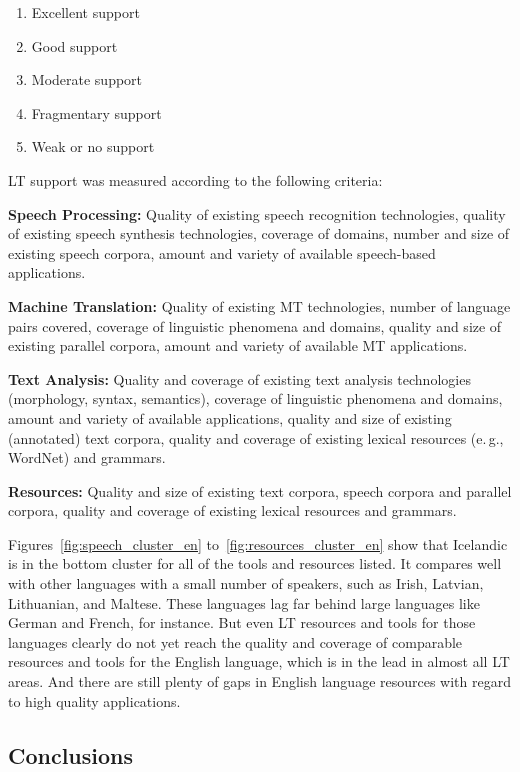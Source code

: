 \begin{multicols}{2}
\begin{enumerate}
\item Excellent support
\item Good support
\item Moderate support
\item Fragmentary support
\item Weak or no support
\end{enumerate}

LT support was measured according to the following criteria:

\textbf{Speech Processing:} Quality of existing speech recognition technologies, quality of existing speech synthesis technologies, coverage of domains, number and size of existing speech corpora, amount and variety of available speech-based applications.

\textbf{Machine Translation:} Quality of existing MT technologies, number of language pairs covered, coverage of linguistic phenomena and domains, quality and size of existing parallel corpora, amount and variety of available MT applications.

\textbf{Text Analysis:} Quality and coverage of existing text analysis technologies (morphology, syntax, semantics), coverage of linguistic phenomena and domains, amount and variety of available applications, quality and size of existing (annotated) text corpora, quality and coverage of existing lexical resources (e.\,g., WordNet) and grammars.

\textbf{Resources:} Quality and size of existing text corpora, speech corpora and parallel corpora, quality and coverage of existing lexical resources and grammars.

Figures~\ref{fig:speech_cluster_en} to~\ref{fig:resources_cluster_en} show that Icelandic is in the bottom cluster for all of the tools and resources listed. It compares well with other languages with a small number of speakers, such as Irish, Latvian, Lithuanian, and Maltese. These languages lag far behind large languages like German and French, for instance. But even LT resources and tools for those languages clearly do not yet reach the quality and coverage of comparable resources and tools for the English language, which is in the lead in almost all LT areas. And there are still plenty of gaps in English language resources with regard to high quality applications.

\subsection{Conclusions}


\end{multicols}
